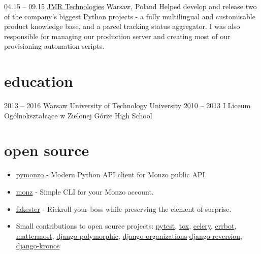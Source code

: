 \documentclass[]{cv-style}  %
\begin{document}
\begin{entrylist}
\entry
  {04.15 -- 09.15}
  {\href{https://jmr.pl/}{JMR Technologies}}
  {Warsaw, Poland}
  {Helped develop and release two of the company's biggest Python projects - a fully multilingual and customisable product knowledge base, and a parcel tracking status aggregator. I was also responsible for managing our production server and creating most of our provisioning automation scripts.}
\end{entrylist}

\vspace{-0.3cm}


\section{education}
  \vspace{-0.3cm}

\begin{entrylist}
\entry
  {2013 -- 2016}
  {Warsaw University of Technology}
  {University}
  {}
\entry
  {2010 -- 2013}
  {I Liceum Ogólnokształcące w Zielonej Górze}
  {High School}
  {}
\end{entrylist}

\vspace{-0.6cm}


\section{open source}
  \vspace{-0.25cm}

\begin{itemize}
  \item \href{https://github.com/pawelad/pymonzo}{pymonzo} - Modern Python API client for Monzo public API.
  \item \href{https://github.com/pawelad/monz}{monz} - Simple CLI for your Monzo account.
  \item \href{https://github.com/pawelad/fakester}{fakester} - Rickroll your boss while preserving the element of surprise.
  \item Small contributions to open source projects: \href{https://github.com/pytest-dev/pytest}{pytest}, \href{https://github.com/tox-dev/tox}{tox}, \href{https://github.com/celery/celery}{celery}, \href{https://github.com/errbotio/errbot}{errbot}, \href{https://github.com/mattermost/mattermost}{mattermost}, \href{https://github.com/jazzband/django-polymorphic}{django-polymorphic}, \href{https://github.com/bennylope/django-organizations}{django-organizations} \href{https://github.com/etianen/django-reversion}{django-reversion}, \href{https://github.com/jgorset/django-kronos}{django-kronos}
\end{itemize}
\end{document}
